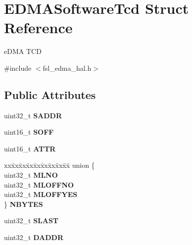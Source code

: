 \hypertarget{structEDMASoftwareTcd}{}\section{E\+D\+M\+A\+Software\+Tcd Struct Reference}
\label{structEDMASoftwareTcd}


e\+D\+MA T\+CD  




{\ttfamily \#include $<$fsl\+\_\+edma\+\_\+hal.\+h$>$}

\subsection*{Public Attributes}
\begin{DoxyCompactItemize}
\item 
uint32\+\_\+t {\bfseries S\+A\+D\+DR}\hypertarget{structEDMASoftwareTcd_acdb748276dadc4032baa2350db49a7c9}{}\label{structEDMASoftwareTcd_acdb748276dadc4032baa2350db49a7c9}

\item 
uint16\+\_\+t {\bfseries S\+O\+FF}\hypertarget{structEDMASoftwareTcd_a4a88be7cc945376ea4e6d390b82d370f}{}\label{structEDMASoftwareTcd_a4a88be7cc945376ea4e6d390b82d370f}

\item 
uint16\+\_\+t {\bfseries A\+T\+TR}\hypertarget{structEDMASoftwareTcd_a0d6f40b35db74f4406732130bbb9c980}{}\label{structEDMASoftwareTcd_a0d6f40b35db74f4406732130bbb9c980}

\item 
\begin{tabbing}
xx\=xx\=xx\=xx\=xx\=xx\=xx\=xx\=xx\=\kill
union \{\\
\>uint32\_t {\bfseries MLNO}\\
\>uint32\_t {\bfseries MLOFFNO}\\
\>uint32\_t {\bfseries MLOFFYES}\\
\} {\bfseries NBYTES}\hypertarget{structEDMASoftwareTcd_a633736633d8aac5297a9de2b105054ee}{}\label{structEDMASoftwareTcd_a633736633d8aac5297a9de2b105054ee}
\\

\end{tabbing}\item 
uint32\+\_\+t {\bfseries S\+L\+A\+ST}\hypertarget{structEDMASoftwareTcd_aa9fc87f7bb165b35f79fcea8abee4af0}{}\label{structEDMASoftwareTcd_aa9fc87f7bb165b35f79fcea8abee4af0}

\item 
uint32\+\_\+t {\bfseries D\+A\+D\+DR}\hypertarget{structEDMASoftwareTcd_a9c9d27bdd8e86848273fcf9fc9a75b71}{}\label{structEDMASoftwareTcd_a9c9d27bdd8e86848273fcf9fc9a75b71}


\end{DoxyCompactItemize}
